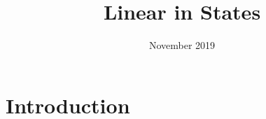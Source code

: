 \documentclass[11pt]{article}
\title{Linear in States}
\author{ }
\date{November 2019}
\begin{document}
\maketitle

\section{Introduction}

%
%

\end{document}
